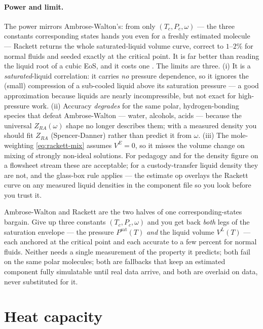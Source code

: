 \documentclass[11pt,a4paper]{article}
\newcommand{\Psat}{P^{\mathrm{sat}}}
\begin{document}
\paragraph{Power and limit.}  The power mirrors Ambrose-Walton's: from
only $(T_c, P_c, \omega)$ --- the three constants corresponding states
hands you even for a freshly estimated molecule --- Rackett returns the
whole saturated-liquid volume curve, correct to $1$--$2\%$ for normal
fluids and seeded exactly at the critical point.  It is far better than
reading the liquid root of a cubic EoS, and it costs one .
The limits are three.  (i) It is a \emph{saturated}-liquid correlation:
it carries \emph{no} pressure dependence, so it ignores the (small)
compression of a sub-cooled liquid above its saturation pressure --- a
good approximation because liquids are nearly incompressible, but not
exact for high-pressure work.  (ii) Accuracy \emph{degrades} for the
same polar, hydrogen-bonding species that defeat Ambrose-Walton ---
water, alcohols, acids --- because the universal $Z_{RA}(\omega)$ shape
no longer describes them; with a measured density you should fit
$Z_{RA}$ (Spencer-Danner) rather than predict it from $\omega$.
(iii) The mole-weighting \eqref{eq:rackett-mix} assumes $V^E=0$, so it
misses the volume change on mixing of strongly non-ideal solutions.
For pedagogy and for the density figure on a flowsheet stream these are
acceptable; for a custody-transfer liquid density they are not, and the
glass-box rule applies --- the estimate op overlays the Rackett curve on
any measured liquid densities in the component file so you look before
you trust it.

\begin{intuition}
Ambrose-Walton and Rackett are the two halves of one
corresponding-states bargain.  Give up three constants
$(T_c,P_c,\omega)$ and you get back \emph{both} legs of the saturation
envelope --- the pressure $\Psat(T)$ \emph{and} the liquid volume
$V^L(T)$ --- each anchored at the critical point and each accurate to a
few percent for normal fluids.  Neither needs a single measurement of
the property it predicts; both fail on the same polar molecules; both
are fallbacks that keep an estimated component fully simulatable until
real data arrive, and both are overlaid on data, never substituted for
it.
\end{intuition}

\section{Heat capacity}\label{ch:heat}
\end{document}

